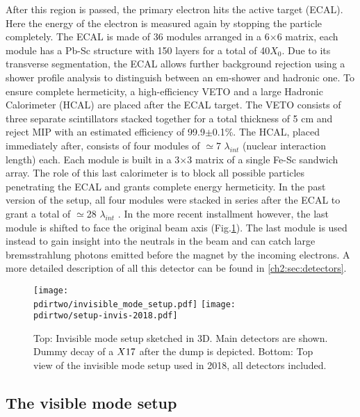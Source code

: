 After this region is passed, the primary electron hits the active target (ECAL). Here the energy of the electron is measured again by stopping the particle completely. The ECAL is made of 36 modules arranged in a 6$\times$6 matrix, each module has a Pb-Sc structure with 150 layers for a total of 40$X_0$. Due to its transverse segmentation, the ECAL allows further background rejection using a shower profile analysis to distinguish between an em-shower and hadronic one. To ensure complete hermeticity, a high-efficiency VETO and a large Hadronic Calorimeter (HCAL) are placed after the ECAL target. The VETO consists of three separate scintillators stacked together for a total thickness of 5 \si{\centi\meter} and reject MIP with an estimated efficiency of 99.9$\pm$0.1\%. The HCAL, placed immediately after, consists of four modules of $\simeq$7 $\lambda_{int}$ (nuclear interaction length) each. Each module is built in a 3$\times$3 matrix of a single Fe-Sc sandwich array. The role of this last calorimeter is to block all possible particles penetrating the ECAL and grants complete energy hermeticity. In the past version of the setup, all four modules were stacked in series after the ECAL to grant a total of $\simeq$28 $\lambda_{int}$ \cite{Banerjee:2016tad}. In the more recent installment however, the last module is shifted to face the original beam axis (Fig.\ref{fig:setup-invis-2018}). The last module is used instead to gain insight into the neutrals in the beam and can catch large bremsstrahlung photons emitted before the magnet by the incoming electrons. A more detailed description of all this detector can be found in \ref{ch2:sec:detectors}.

\begin{figure}[tbh!]
  \centering
  \texttt{[image: \\pdirtwo/invisible\_mode\_setup.pdf]}
\texttt{[image: \\pdirtwo/setup-invis-2018.pdf]}
\caption[invisible mode setup 2018]{Top: Invisible mode setup sketched in 3D. Main detectors are shown. Dummy decay of a $X17$ after the dump is depicted. Bottom: Top view of the invisible mode setup used in 2018, all detectors included.}
\label{fig:setup-invis-2018}
\end{figure}

\subsection{The visible mode setup}
\label{ch2:sec:vismode}

